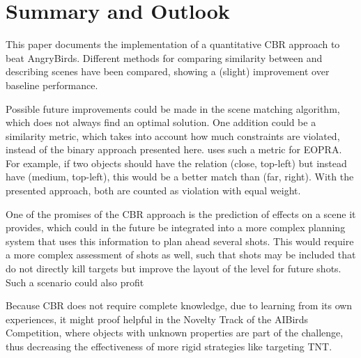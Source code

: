 \section{Summary and Outlook}\label{sec:outlook}
This paper documents the implementation of a quantitative \ac{CBR} approach to beat AngryBirds. Different methods for comparing similarity between and describing scenes have been compared, showing a (slight) improvement over baseline performance.

Possible future improvements could be made in the scene matching algorithm, which does not always find an optimal solution.
One addition could be a similarity metric, which takes into account how much constraints are violated, instead of the binary approach presented here.
\cite{QCBR} uses such a metric for \ac{EOPRA}. For example, if two objects should have the relation (close, top-left) but instead have (medium, top-left), this would be a better match than (far, right). With the presented approach, both are counted as violation with equal weight.

One of the promises of the \ac{CBR} approach is the prediction of effects on a scene it provides, which could in the future be integrated into a more complex planning system that uses this information to plan ahead several shots.
This would require a more complex assessment of shots as well, such that shots may be included that do not directly kill targets but improve the layout of the level for future shots. Such a scenario could also profit

Because \ac{CBR} does not require complete knowledge, due to learning from its own experiences, it might proof helpful in the Novelty Track of the AIBirds Competition, where objects with unknown properties are part of the challenge, thus decreasing the effectiveness of more rigid strategies like targeting TNT.
